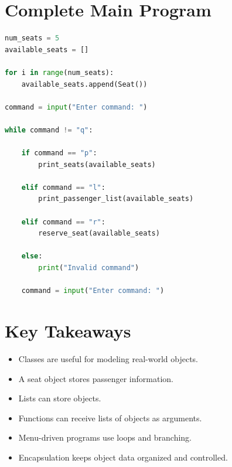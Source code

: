 \documentclass[11pt]{article}
\begin{document}
\section{Complete Main Program}

\begin{lstlisting}[language=Python]
num_seats = 5
available_seats = []

for i in range(num_seats):
    available_seats.append(Seat())

command = input("Enter command: ")

while command != "q":

    if command == "p":
        print_seats(available_seats)

    elif command == "l":
        print_passenger_list(available_seats)

    elif command == "r":
        reserve_seat(available_seats)

    else:
        print("Invalid command")

    command = input("Enter command: ")
\end{lstlisting}

\section{Key Takeaways}

\begin{itemize}
    \item Classes are useful for modeling real-world objects.
    \item A seat object stores passenger information.
    \item Lists can store objects.
    \item Functions can receive lists of objects as arguments.
    \item Menu-driven programs use loops and branching.
    \item Encapsulation keeps object data organized and controlled.
\end{itemize}
\end{document}
